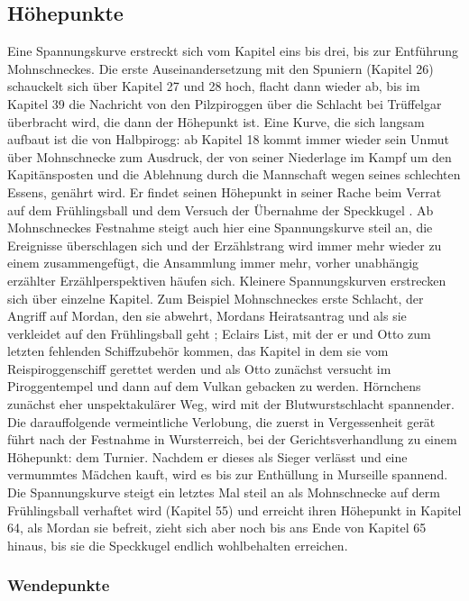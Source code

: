 {\subsection{Höhepunkte}
Eine Spannungskurve erstreckt sich vom Kapitel eins bis drei, bis zur Entführung Mohnschneckes. Die erste Auseinandersetzung mit den Spuniern (Kapitel 26) schauckelt sich über Kapitel 27 und 28 hoch, flacht dann wieder ab, bis im Kapitel 39 die Nachricht von den Pilzpiroggen über die Schlacht bei Trüffelgar überbracht wird, die dann der Höhepunkt ist. Eine Kurve, die sich langsam aufbaut ist die von Halbpirogg: ab Kapitel 18 kommt immer wieder sein Unmut über Mohnschnecke zum Ausdruck, der von seiner Niederlage im Kampf um den Kapitänsposten und die Ablehnung durch die Mannschaft wegen seines schlechten Essens,  genährt wird. Er findet seinen Höhepunkt in seiner Rache beim Verrat auf dem Frühlingsball und dem Versuch der Übernahme der Speckkugel . Ab Mohnschneckes Festnahme steigt auch hier eine Spannungskurve steil an, die Ereignisse überschlagen sich und der Erzählstrang wird immer mehr wieder zu einem zusammengefügt, die Ansammlung immer mehr, vorher unabhängig erzählter Erzählperspektiven häufen sich. Kleinere Spannungskurven erstrecken sich über einzelne Kapitel. Zum Beispiel Mohnschneckes erste Schlacht, der Angriff auf Mordan, den sie abwehrt, Mordans Heiratsantrag und als sie verkleidet auf den Frühlingsball geht ; Eclairs List, mit der er und Otto zum letzten fehlenden Schiffzubehör kommen, das Kapitel in dem sie vom Reispiroggenschiff gerettet werden und als Otto zunächst versucht im Piroggentempel und dann auf dem Vulkan gebacken zu werden. Hörnchens zunächst eher unspektakulärer Weg, wird mit der Blutwurstschlacht spannender. Die darauffolgende vermeintliche Verlobung, die zuerst in Vergessenheit gerät führt nach der Festnahme in Wursterreich, bei der Gerichtsverhandlung zu einem Höhepunkt: dem Turnier. Nachdem er dieses als Sieger verlässt und eine vermummtes Mädchen kauft, wird es bis zur Enthüllung in Murseille spannend. Die Spannungskurve steigt ein letztes Mal steil an als Mohnschnecke auf derm Frühlingsball verhaftet wird (Kapitel 55) und erreicht ihren Höhepunkt in Kapitel 64, als Mordan sie befreit, zieht sich aber noch bis ans Ende von Kapitel 65 hinaus, bis sie die Speckkugel endlich wohlbehalten erreichen.

\subsubsection{Wendepunkte}

}
